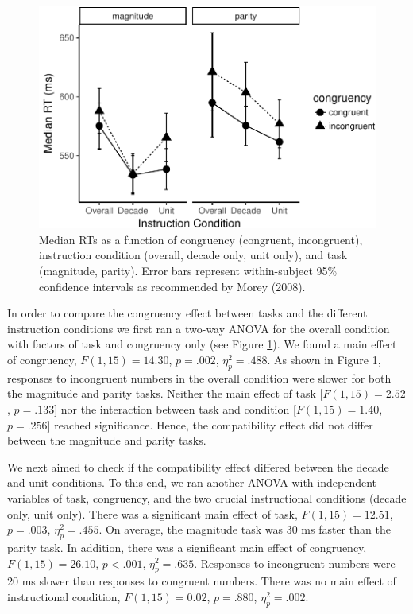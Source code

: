 \documentclass[english,man]{apa6}
\theoremstyle{definition}
\theoremstyle{definition}
\theoremstyle{definition}
\theoremstyle{remark}
\begin{document}
\begin{figure}
\centering
\includegraphics{paper_files/figure-latex/exp1-1.pdf}
\caption{\label{fig:exp1}Median RTs as a function of congruency (congruent,
incongruent), instruction condition (overall, decade only, unit only),
and task (magnitude, parity). Error bars represent within-subject 95\%
confidence intervals as recommended by Morey (2008).}
\end{figure}

In order to compare the congruency effect between tasks and the
different instruction conditions we first ran a two-way ANOVA for the
overall condition with factors of task and congruency only (see Figure
\ref{fig:exp1}). We found a main effect of congruency,
\(F(1, 15) = 14.30\), \(p = .002\), \(\eta^2_p = .488\). As shown in
Figure 1, responses to incongruent numbers in the overall condition were
slower for both the magnitude and parity tasks. Neither the main effect
of task {[}\(F(1, 15) = 2.52\), \(p = .133\){]} nor the interaction
between task and condition {[}\(F(1, 15) = 1.40\), \(p = .256\){]}
reached significance. Hence, the compatibility effect did not differ
between the magnitude and parity tasks.

We next aimed to check if the compatibility effect differed between the
decade and unit conditions. To this end, we ran another ANOVA with
independent variables of task, congruency, and the two crucial
instructional conditions (decade only, unit only). There was a
significant main effect of task, \(F(1, 15) = 12.51\), \(p = .003\),
\(\eta^2_p = .455\). On average, the magnitude task was 30 ms faster
than the parity task. In addition, there was a significant main effect
of congruency, \(F(1, 15) = 26.10\), \(p < .001\), \(\eta^2_p = .635\).
Responses to incongruent numbers were 20 ms slower than responses to
congruent numbers. There was no main effect of instructional condition,
\(F(1, 15) = 0.02\), \(p = .880\), \(\eta^2_p = .002\).
\end{document}
